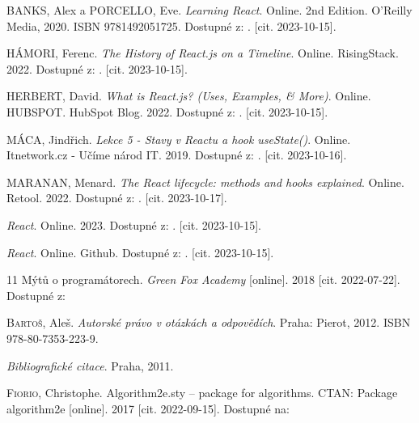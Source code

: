 

\begin{thebibliography}{99}\radkovani[1.2]\raggedright
\label{chap:literatura}

\textsc{BANKS}, Alex a \textsc{PORCELLO}, Eve. \emph{Learning React}. Online. 2nd Edition. O'Reilly Media, 2020. ISBN 9781492051725. Dostupné z: . [cit. 2023-10-15].

\textsc{HÁMORI}, Ferenc. \emph{The History of React.js on a Timeline}. Online. RisingStack. 2022. Dostupné z: . [cit. 2023-10-15].

\textsc{HERBERT}, David. \emph{What is React.js? (Uses, Examples, \& More)}. Online. HUBSPOT. HubSpot Blog. 2022. Dostupné z: . [cit. 2023-10-15].

\textsc{MÁCA}, Jindřich. \emph{Lekce 5 - Stavy v Reactu a hook useState()}. Online. Itnetwork.cz - Učíme národ IT. 2019. Dostupné z: . [cit. 2023-10-16].

\textsc{MARANAN}, Menard. \emph{The React lifecycle: methods and hooks explained}. Online. Retool. 2022. Dostupné z: . [cit. 2023-10-17].

\emph{React}. Online. 2023. Dostupné z: . [cit. 2023-10-15].

\emph{React}. Online. Github. Dostupné z: . [cit. 2023-10-15].



11 Mýtů o programátorech. \emph{Green Fox Academy} [online]. 2018 [cit. 2022-07-22]. Dostupné z: 

\textsc{Bartoš}, Aleš. \emph{Autorské právo v otázkách a odpovědích}. Praha: Pierot, 2012. ISBN 978-80-7353-223-9.

\emph{Bibliografické citace}. Praha, 2011.

\textsc{Fiorio}, Christophe. Algorithm2e.sty -- package for algorithms. CTAN: Package algorithm2e [online]. 2017 [cit. 2022-09-15]. Dostupné na: 


\end{thebibliography}

